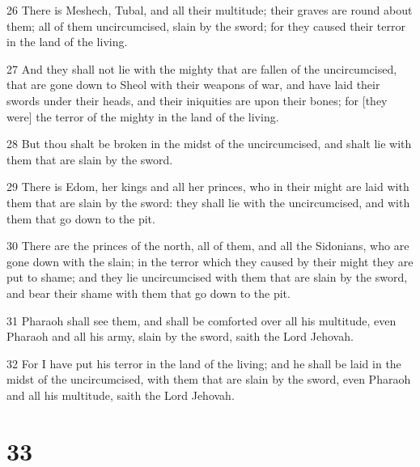 \par 26 There is Meshech, Tubal, and all their multitude; their graves are round about them; all of them uncircumcised, slain by the sword; for they caused their terror in the land of the living.
\par 27 And they shall not lie with the mighty that are fallen of the uncircumcised, that are gone down to Sheol with their weapons of war, and have laid their swords under their heads, and their iniquities are upon their bones; for [they were] the terror of the mighty in the land of the living.
\par 28 But thou shalt be broken in the midst of the uncircumcised, and shalt lie with them that are slain by the sword.
\par 29 There is Edom, her kings and all her princes, who in their might are laid with them that are slain by the sword: they shall lie with the uncircumcised, and with them that go down to the pit.
\par 30 There are the princes of the north, all of them, and all the Sidonians, who are gone down with the slain; in the terror which they caused by their might they are put to shame; and they lie uncircumcised with them that are slain by the sword, and bear their shame with them that go down to the pit.
\par 31 Pharaoh shall see them, and shall be comforted over all his multitude, even Pharaoh and all his army, slain by the sword, saith the Lord Jehovah.
\par 32 For I have put his terror in the land of the living; and he shall be laid in the midst of the uncircumcised, with them that are slain by the sword, even Pharaoh and all his multitude, saith the Lord Jehovah.

\chapter{33}

